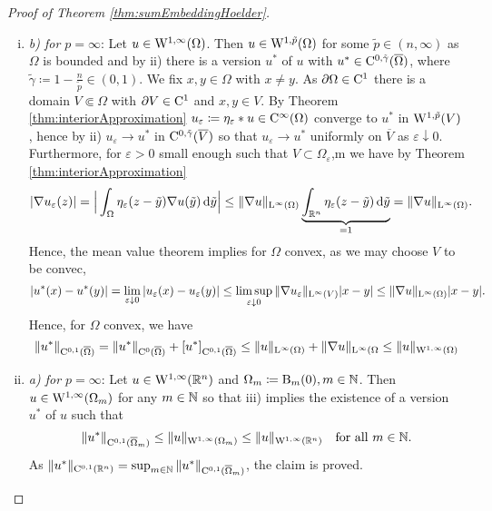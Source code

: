 \begin{proof}[Proof of Theorem \ref{thm:sumEmbeddingHoelder}]
\begin{enumerate}[i)]
    \item \emph{b) for $p = \infty$}:
      Let $u \in \mathrm{W}^{1,\infty}(\Omega)$.
      Then $u \in \mathrm{W}^{1,\tilde p}(\Omega)$ for some $\tilde p \in (n, \infty)$ as $\Omega$ is bounded and by ii) there is a version $u^*$ of $u$ with $u^* \in \mathrm{C}^{0,\tilde\gamma}(\overline\Omega)$, where $\tilde\gamma \coloneqq 1 - \frac{n}{\tilde p} \in (0,1)$.
      We fix $x,y \in \Omega$ with $x \neq y$.
      As $\partial\Omega \in \mathrm{C}^1$ there is a domain $V \Subset \Omega$ with $\partial V \in \mathrm{C}^1$ and $x,y \in V$.
    By Theorem \ref{thm:interiorApproximation} $u_\varepsilon \coloneqq \eta_\varepsilon \ast u \in \mathrm{C}^\infty(\Omega)$ converge to $u^*$ in $\mathrm{W}^{1,\tilde p}(V)$, hence by ii) $u_\varepsilon \to u^*$ in $\mathrm{C}^{0,\tilde\gamma}(\overline V)$ so that $u_\varepsilon \to u^*$ uniformly on $\overline V$ as $\varepsilon \downarrow 0$.
    Furthermore, for $\varepsilon > 0$ small enough such that $V \subset \Omega_\varepsilon$,m we have by Theorem \ref{thm:interiorApproximation}
    $$
    |\nabla u_\varepsilon(z)|
    = \Big|\int_\Omega \eta_\varepsilon (z - \tilde y) \nabla u(\tilde y) \, {\operatorname{d}\!{\tilde y}} \Big|
    \leq \| \nabla u\|_{\mathrm{L}^\infty(\Omega)} \underbrace{\int_{\mathbb{R}^n} \eta_\varepsilon(z - \tilde y) \, {\operatorname{d}\!{\tilde y}}}_{=1}
    = \|\nabla u\|_{\mathrm{L}^\infty(\Omega)}.
    $$
    Hence, the mean value theorem implies for $\Omega$ convex, as we may choose $V$ to be convec,
    $$
    |u^*(x) - u^*(y)|
    = \lim_{\varepsilon \downarrow 0} |u_\varepsilon(x) - u_\varepsilon(y)|
    \leq \limsup_{\varepsilon \downarrow 0} \|\nabla u_\varepsilon\|_{\mathrm{L}^\infty(V)} |x - y|
    \leq \|\nabla u\|_{\mathrm{L}^\infty(\Omega)} |x - y|.
    $$
    Hence, for $\Omega$ convex, we have
    $$
    \|u^*\|_{\mathrm{C}^{0,1}(\overline\Omega)}
    = \|u^*\|_{\mathrm{C}^0(\overline\Omega)} + [u^*]_{\mathrm{C}^{0,1}(\overline\Omega)}
    \leq \|u\|_{\mathrm{L}^\infty(\Omega)} + \|\nabla u\|_{\mathrm{L}^\infty(\Omega}
    \leq \|u\|_{\mathrm{W}^{1,\infty}(\Omega)}
    $$

  \item \emph{a) for $p = \infty$}:
    Let $u \in \mathrm{W}^{1,\infty}(\mathbb{R}^n)$ and $\Omega_m \coloneqq \mathrm{B}_m(0), m \in \mathbb{N}$.
    Then $u \in \mathrm{W}^{1,\infty}(\Omega_m)$ for any $m \in \mathbb{N}$ so that iii) implies the existence of a version $u^*$ of $u$ such that 
    $$
    \|u^*\|_{\mathrm{C}^{0,1}(\overline\Omega_m)}
    \leq \|u\|_{\mathrm{W}^{1,\infty}(\Omega_m)} \leq \|u\|_{\mathrm{W}^{1,\infty}(\mathbb{R}^n)} \quad\text{for all } m \in \mathbb{N}.
    $$
    As $\|u^*\|_{\mathrm{C}^{0,1}(\mathbb{R}^n)} = \sup_{m \in \mathbb{N}} \|u^*\|_{\mathrm{C}^{0,1}(\overline\Omega_m)}$, the claim is proved.


\end{enumerate}
\end{proof}
